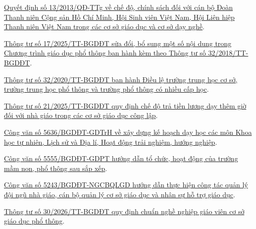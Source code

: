 \documentclass[12pt,a4paper]{report}
\begin{document}
\begin{enumerate}[label={[\arabic*]},leftmargin=1.1cm,itemsep=0.6em]
\item\label{ref:source-8} \href{https://vanban.chinhphu.vn/?docid=165723\&pageid=27160}{Quyết định số 13/2013/QĐ-TTg về chế độ, chính sách đối với cán bộ Đoàn Thanh niên Cộng sản Hồ Chí Minh, Hội Sinh viên Việt Nam, Hội Liên hiệp Thanh niên Việt Nam trong các cơ sở giáo dục và cơ sở dạy nghề}.

\item\label{ref:source-9} \href{https://vanban.chinhphu.vn/?docid=215347\&pageid=27160}{Thông tư số 17/2025/TT-BGDĐT sửa đổi, bổ sung một số nội dung trong Chương trình giáo dục phổ thông ban hành kèm theo Thông tư số 32/2018/TT-BGDĐT}.

\item\label{ref:source-10} \href{https://vanban.chinhphu.vn/?docid=201098\&pageid=27160}{Thông tư số 32/2020/TT-BGDĐT ban hành Điều lệ trường trung học cơ sở, trường trung học phổ thông và trường phổ thông có nhiều cấp học}.

\item\label{ref:source-11} \href{https://vanban.chinhphu.vn/?docid=215462\&pageid=27160}{Thông tư số 21/2025/TT-BGDĐT quy định chế độ trả tiền lương dạy thêm giờ đối với nhà giáo trong các cơ sở giáo dục công lập}.

\item\label{ref:source-12} \href{https://thuvienphapluat.vn/cong-van/Giao-duc/Cong-van-5636-BGDDT-GDTrH-2023-xay-dung-ke-hoach-day-hoc-cac-mon-hoc-Khoa-hoc-tu-nhien-584066.aspx}{Công văn số 5636/BGDĐT-GDTrH về xây dựng kế hoạch dạy học các môn Khoa học tự nhiên, Lịch sử và Địa lí, Hoạt động trải nghiệm, hướng nghiệp}.

\item\label{ref:source-13} \href{https://xaydungchinhsach.chinhphu.vn/cong-van-so-5555-bgddt-gdpt-huong-dan-to-chuc-hoat-dong-cua-truong-mam-non-pho-thong-sau-sap-xep-119260819092236042.htm}{Công văn số 5555/BGDĐT-GDPT hướng dẫn tổ chức, hoạt động của trường mầm non, phổ thông sau sắp xếp}.

\item\label{ref:source-14} \href{https://thuvienphapluat.vn/cong-van/Giao-duc/Cong-van-5243-BGDDT-NGCBQLGD-2026-quan-ly-doi-ngu-nha-giao-can-bo-quan-ly-co-so-giao-duc-718885.aspx}{Công văn số 5243/BGDĐT-NGCBQLGD hướng dẫn thực hiện công tác quản lý đội ngũ nhà giáo, cán bộ quản lý cơ sở giáo dục và nhân sự hỗ trợ giáo dục}.

\item\label{ref:source-15} \href{https://vanban.chinhphu.vn/?docid=217839\&pageid=27160}{Thông tư số 30/2026/TT-BGDĐT quy định chuẩn nghề nghiệp giáo viên cơ sở giáo dục phổ thông}.


\end{enumerate}
\end{document}
